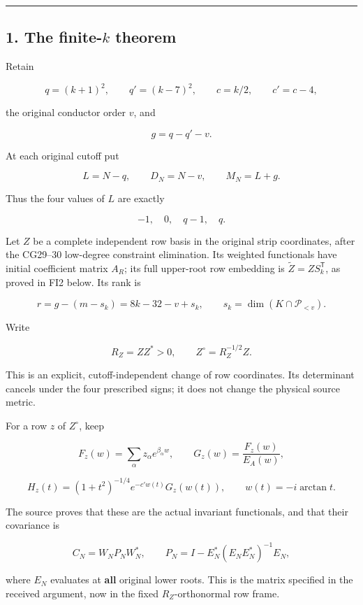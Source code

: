 \documentclass[11pt]{article}
\begin{document}
\begin{center}\rule{0.5\linewidth}{0.5pt}\end{center}

\subsection{\texorpdfstring{1. The finite-\(k\) theorem}{1. The finite-k theorem}}\label{the-finite-k-theorem}

Retain

\[
q=(k+1)^2,\qquad q'=(k-7)^2,\qquad
c=k/2,\qquad c'=c-4,
\]

the original conductor order \(v\), and

\[
g=q-q'-v.
\]

At each original cutoff put

\[
L=N-q,\qquad D_N=N-v,\qquad M_N=L+g.
\]

Thus the four values of \(L\) are exactly

\[
-1,\quad0,\quad q-1,\quad q.
\]

Let \(Z\) be a complete independent row basis in the original strip coordinates, after the CG29--30 low-degree constraint elimination. Its weighted functionals have initial coefficient matrix \(A_R\); its full upper-root row embedding is \(\widetilde Z=ZS_k^{\mathsf T}\), as proved in FI2 below. Its rank is

\[
r=g-(m-s_k)=8k-32-v+s_k,
\qquad s_k=\dim(K\cap\mathcal P_{<v}).
\]

Write

\[
R_Z=ZZ^*>0,\qquad Z^\circ=R_Z^{-1/2}Z.
\]

This is an explicit, cutoff-independent change of row coordinates. Its determinant cancels under the four prescribed signs; it does not change the physical source metric.

For a row \(z\) of \(Z^\circ\), keep

\[
F_z(w)=\sum_\alpha z_\alpha e^{\beta_\alpha w},
\qquad
G_z(w)=\frac{F_z(w)}{E_A(w)},
\]

\[
H_z(t)
=(1+t^2)^{-1/4}e^{-c'w(t)}G_z(w(t)),
\qquad w(t)=-i\arctan t.
\]

The source proves that these are the actual invariant functionals, and that their covariance is

\[
C_N
=
W_NP_NW_N^*,
\qquad
P_N=I-E_N^*(E_NE_N^*)^{-1}E_N,
\tag{1}
\]

where \(E_N\) evaluates at \textbf{all} original lower roots. This is the matrix specified in the received argument, now in the fixed \(R_Z\)-orthonormal row frame.
\end{document}
